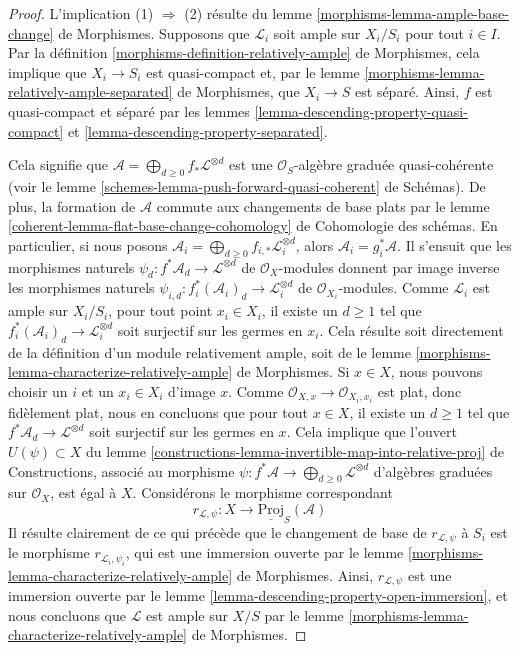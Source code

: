 \begin{proof}
L'implication (1) $\Rightarrow$ (2) résulte du
lemme \ref{morphisms-lemma-ample-base-change} de Morphismes.
Supposons que $\mathcal{L}_i$ soit ample sur $X_i/S_i$ pour tout $i \in I$.
Par la définition \ref{morphisms-definition-relatively-ample} de Morphismes,
cela implique que $X_i \to S_i$ est quasi-compact et, par
le lemme \ref{morphisms-lemma-relatively-ample-separated} de Morphismes,
que $X_i \to S$ est séparé.
Ainsi, $f$ est quasi-compact et séparé par les
lemmes \ref{lemma-descending-property-quasi-compact} et
\ref{lemma-descending-property-separated}.

\medskip\noindent
Cela signifie que
$\mathcal{A} = \bigoplus_{d \geq 0} f_*\mathcal{L}^{\otimes d}$
est une $\mathcal{O}_S$-algèbre graduée quasi-cohérente
(voir le lemme \ref{schemes-lemma-push-forward-quasi-coherent} de Schémas).
De plus, la formation de $\mathcal{A}$ commute aux changements de base plats par
le lemme \ref{coherent-lemma-flat-base-change-cohomology}
de Cohomologie des schémas.
En particulier, si nous posons
$\mathcal{A}_i = \bigoplus_{d \geq 0} f_{i, *}\mathcal{L}_i^{\otimes d}$,
alors $\mathcal{A}_i = g_i^*\mathcal{A}$.
Il s'ensuit que les morphismes naturels
$\psi_d : f^*\mathcal{A}_d \to \mathcal{L}^{\otimes d}$
de $\mathcal{O}_X$-modules donnent par image inverse les morphismes naturels
$\psi_{i, d} : f_i^*(\mathcal{A}_i)_d \to \mathcal{L}_i^{\otimes d}$
de $\mathcal{O}_{X_i}$-modules. Comme $\mathcal{L}_i$ est ample sur $X_i/S_i$,
pour tout point $x_i \in X_i$, il existe un $d \geq 1$ tel que
$f_i^*(\mathcal{A}_i)_d \to \mathcal{L}_i^{\otimes d}$
soit surjectif sur les germes en $x_i$. Cela résulte soit directement
de la définition d'un module relativement ample, soit de
le lemme \ref{morphisms-lemma-characterize-relatively-ample} de Morphismes.
Si $x \in X$, nous pouvons choisir un $i$ et un $x_i \in X_i$
d'image $x$. Comme $\mathcal{O}_{X, x} \to \mathcal{O}_{X_i, x_i}$
est plat, donc fidèlement plat, nous en concluons que pour tout $x \in X$,
il existe un $d \geq 1$ tel que
$f^*\mathcal{A}_d \to \mathcal{L}^{\otimes d}$
soit surjectif sur les germes en $x$.
Cela implique que l'ouvert $U(\psi) \subset X$ du
lemme \ref{constructions-lemma-invertible-map-into-relative-proj} de Constructions,
associé au morphisme
$\psi : f^*\mathcal{A} \to \bigoplus_{d \geq 0} \mathcal{L}^{\otimes d}$
d'algèbres graduées sur $\mathcal{O}_X$,
est égal à $X$. Considérons le morphisme correspondant
$$
r_{\mathcal{L}, \psi} : X \longrightarrow \underline{\text{Proj}}_S(\mathcal{A})
$$
Il résulte clairement de ce qui précède que le changement de base de
$r_{\mathcal{L}, \psi}$ à $S_i$ est le morphisme
$r_{\mathcal{L}_i, \psi_i}$, qui est une immersion ouverte par le
lemme \ref{morphisms-lemma-characterize-relatively-ample} de Morphismes.
Ainsi, $r_{\mathcal{L}, \psi}$ est une immersion ouverte par le
lemme \ref{lemma-descending-property-open-immersion},
et nous concluons que $\mathcal{L}$ est ample sur $X/S$ par
le lemme \ref{morphisms-lemma-characterize-relatively-ample} de Morphismes.
\end{proof}
